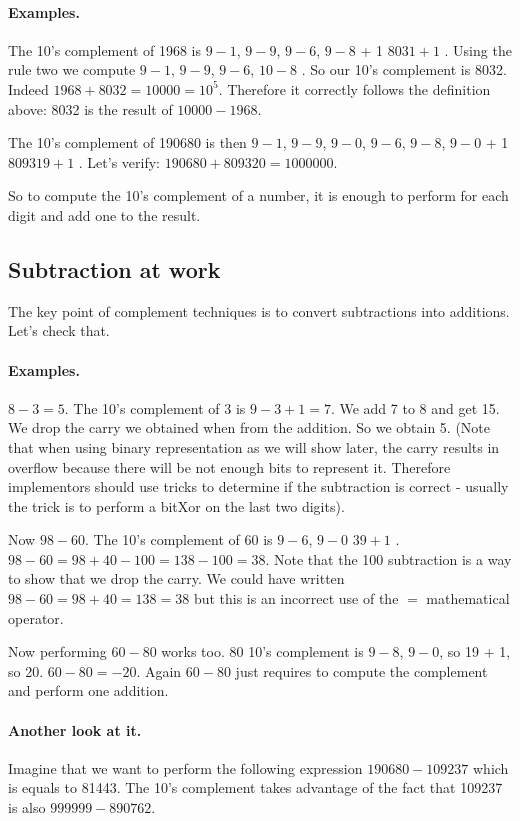 \documentclass[a4paper,10pt,twoside]{book}
\begin{document}
\paragraph{Examples.}
The 10's complement of 1968 is $9-1$, $9-9$, $9-6$, $9-8$ + 1 \ie $8031 + 1$ . 
Using the rule two we compute $9-1$, $9-9$, $9-6$, $10-8$ . So our 10's complement is 8032. Indeed $1968 + 8032 = 10000 = 10^{5}$. Therefore it correctly follows the definition above: 8032 is the result of $10000 - 1968$.

The 10's complement of 190680 is then $9-1$, $9-9$, $9-0$, $9-6$, $9-8$, $9-0$ + 1 \ie $809319 + 1$ . Let's verify: $190680 + 809320 = 1000000$.
 
So to compute the 10's complement of a number, it is enough to perform  for each digit and add one to the result.

\subsection{Subtraction at work}
The key point of complement techniques is to convert subtractions into additions. Let's check that.

\paragraph{Examples.}
$8 - 3 = 5$. The 10's complement of 3 is $9 - 3 + 1 = 7$. We add 7 to 8 and get 15. 
We drop the carry we obtained when from the addition. So we obtain 5. (Note that when using binary representation as we will show later, the carry results in overflow because there will be not enough bits to represent it. Therefore implementors should use tricks to determine if the subtraction is correct - usually the trick is to perform a bitXor on the last two digits).

Now $98-60$. The 10's complement of 60 is $9-6$, $9-0$ \ie $39 + 1$ . 
 $98-60 = 98 + 40 - 100 = 138 - 100 = 38$. Note that the 100 subtraction is a way to show that we drop the carry. 
 We could have written $98-60 = 98 + 40 = 138 = 38$ but this is an incorrect use of the $=$ mathematical operator.


Now performing $60-80$ works too. 80 10's complement is $9-8$, $9-0$, so 19 + 1, so 20.
$60 - 80 = -20$. Again $60-80$ just requires to compute the complement and perform one addition.


\paragraph{Another look at it.} 
Imagine that we want to perform the following expression $190680 - 109237$ which is equals to 81443.
The 10's complement takes advantage of the fact that 109237 is also $999999 - 890762$.
\end{document}
